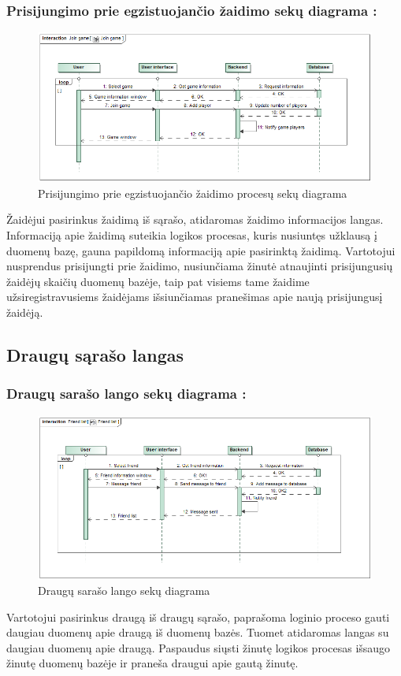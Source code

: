 \documentclass{VUMIFPSkursinis}
\begin{document}
		\subsubsection*{Prisijungimo prie egzistuojančio žaidimo sekų diagrama :}
			\begin{figure}[H]
				\centering
				\includegraphics[scale=0.5]{img/JoinGame_sequence}
				\caption{Prisijungimo prie egzistuojančio žaidimo procesų sekų diagrama}
				\label{img:Hostgame_sequence}
			\end{figure}
			Žaidėjui pasirinkus žaidimą iš sąrašo, atidaromas žaidimo informacijos 
			langas. Informaciją apie žaidimą suteikia logikos procesas, kuris
			nusiuntęs užklausą į duomenų bazę, gauna papildomą informaciją apie 
			pasirinktą žaidimą. Vartotojui nusprendus prisijungti prie žaidimo, 
			nusiunčiama žinutė atnaujinti prisijungusių žaidėjų skaičių duomenų bazėje,
			taip pat visiems tame žaidime užsiregistravusiems žaidėjams išsiunčiamas 
			pranešimas apie naują prisijungusį žaidėją.

	\subsection{Draugų sąrašo langas}		
		\subsubsection*{Draugų sarašo lango sekų diagrama :}
			\begin{figure}[H]
				\centering
				\includegraphics[scale=0.5]{img/FriendList_sequence}
				\caption{Draugų sarašo lango sekų diagrama}
				\label{img:FriendList_sequence}
			\end{figure}
			Vartotojui pasirinkus draugą iš draugų sąrašo, paprašoma loginio proceso
			gauti daugiau duomenų apie draugą iš duomenų bazės. Tuomet atidaromas 
			langas su daugiau duomenų apie draugą. Paspaudus siųsti žinutę logikos 
			procesas išsaugo žinutę duomenų bazėje ir praneša draugui apie gautą žinutę.
			
\end{document}

